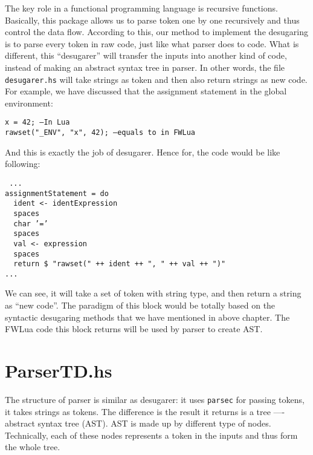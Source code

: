 The key role in a functional programming language is recursive functions. Basically, this package allows us to parse token one by one recursively and thus control the data flow. According to this, our method to implement the desugaring is to parse every token in raw code, just like what parser does to code. What is different, this ``desugarer'' will transfer the inputs into another kind of code, instead of making an abstract syntax tree in parser. In other words, the file {\tt desugarer.hs} will take strings as token and then also return strings as new code. For example, we have discussed that the assignment statement in the global environment:
\begin{flushleft}
{\tt x = 42; --In Lua\\
rawset("\_ENV", "x", 42); --equals to in FWLua\\
}
\end{flushleft}
And this is exactly the job of desugarer. Hence for, the code would be like following:
\begin{flushleft}
{\tt 
...\\
assignmentStatement = do\\
~~ident <- identExpression\\
~~spaces\\
~~char '='\\
~~spaces\\
~~val <- expression\\
~~spaces\\
~~return \$ "rawset(" ++ ident ++ ", " ++ val ++ ")"\\
...\\
}
\end{flushleft}

We can see, it will take a set of token with string type, and then return a string as ``new code''. The paradigm of this block would be totally based on the syntactic desugaring methods that we have mentioned in above chapter. The FWLua code this block returns will be used by parser to create AST.

\section{ParserTD.hs}
The structure of parser is similar as desugarer: it uses {\tt parsec} for passing tokens, it takes strings as tokens. The difference is the result it returns is a tree ---- abstract syntax tree (AST).
AST is made up by different type of nodes. Technically, each of these nodes represents a token in the inputs and thus form the whole tree.

